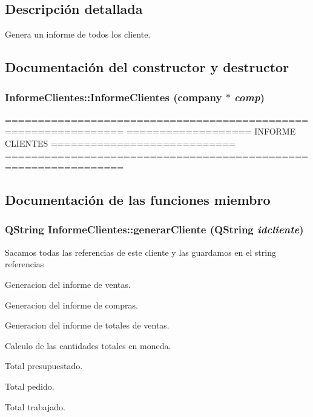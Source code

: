 \subsection{Descripci\'{o}n detallada}
Genera un informe de todos los cliente. 



\subsection{Documentaci\'{o}n del constructor y destructor}
\subsubsection{\setlength{\rightskip}{0pt plus 5cm}Informe\-Clientes::Informe\-Clientes ({\bf company} $\ast$ {\em comp})}\label{classInformeClientes_a2}


================================================================ =================== INFORME CLIENTES ============================ ================================================================ 

\subsection{Documentaci\'{o}n de las funciones miembro}
\subsubsection{\setlength{\rightskip}{0pt plus 5cm}QString Informe\-Clientes::generar\-Cliente (QString {\em idcliente})}\label{classInformeClientes_a0}


Sacamos todas las referencias de este cliente y las guardamos en el string referencias

Generacion del informe de ventas.

Generacion del informe de compras.

Generacion del informe de totales de ventas.

Calculo de las cantidades totales en moneda.

Total presupuestado.

Total pedido.

Total trabajado.

